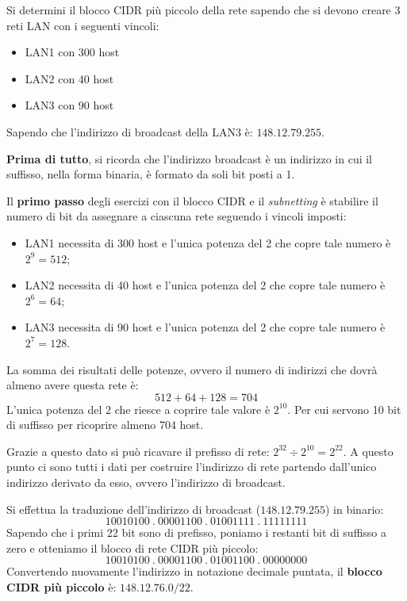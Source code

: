 \documentclass[a4paper]{article}
\newcommand{\binaryaddresspointed}[4]{#1\:.\:#2\:.\:#3\:.\:#4}
\begin{document}
	\noindent
	Si determini il blocco CIDR più piccolo della rete sapendo che si devono creare 3 reti LAN con i seguenti vincoli:
	\begin{itemize}
		\item LAN1 con 300 host
		\item LAN2 con 40 host
		\item LAN3 con 90 host
	\end{itemize}
	Sapendo che l'indirizzo di broadcast della LAN3 è: $148.12.79.255$.\newline
	
	\noindent
	\textbf{Prima di tutto}, si ricorda che l’indirizzo broadcast è un indirizzo in cui il suffisso, nella forma binaria, è formato da soli bit posti a 1.\newline
	
	\noindent
	Il \textbf{primo passo} degli esercizi con il blocco CIDR e il \emph{subnetting} è stabilire il numero di bit da assegnare a ciascuna rete seguendo i vincoli imposti:
	\begin{itemize}
		\item LAN1 necessita di 300 host e l'unica potenza del 2 che copre tale numero è $2^{9} = 512$;
		\item LAN2 necessita di 40 host e l'unica potenza del 2 che copre tale numero è $2^{6} = 64$;
		\item LAN3 necessita di 90 host e l'unica potenza del 2 che copre tale numero è $2^{7} = 128$.
	\end{itemize}
	La somma dei risultati delle potenze, ovvero il numero di indirizzi che dovrà almeno avere questa rete è:
	\begin{equation*}
		512 + 64 + 128 = 704
	\end{equation*}
	L'unica potenza del 2 che riesce a coprire tale valore è $2^{10}$. Per cui servono 10 bit di suffisso per ricoprire almeno 704 host.\newline
	
	\noindent
	Grazie a questo dato si può ricavare il prefisso di rete: $2^{32} \div 2^{10}=2^{22}$. A questo punto ci sono tutti i dati per costruire l’indirizzo di rete partendo dall’unico indirizzo derivato da esso, ovvero l’indirizzo di broadcast.\newline
	
	\noindent
	Si effettua la traduzione dell’indirizzo di broadcast ($148.12.79.255$) in binario:
	\begin{equation*}
		\binaryaddresspointed{10010100}{00001100}{01001111}{11111111}
	\end{equation*}
	Sapendo che i primi 22 bit sono di prefisso, poniamo i restanti bit di suffisso a zero e otteniamo il blocco di rete CIDR più piccolo:
	\begin{equation*}
		\binaryaddresspointed{10010100}{00001100}{01001100}{00000000}
	\end{equation*}
	Convertendo nuovamente l’indirizzo in notazione decimale puntata, il \textbf{blocco CIDR più piccolo} è: $148.12.76.0/22$.\newline
	
\end{document}
